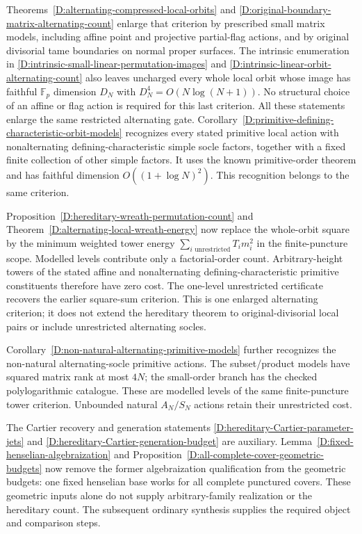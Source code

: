 Theorems~\ref{D:alternating-compressed-local-orbits} and
\ref{D:original-boundary-matrix-alternating-count} enlarge that
criterion by prescribed small matrix models, including affine point
and projective partial-flag actions, and by original divisorial tame
boundaries on normal proper surfaces. The intrinsic enumeration in
\ref{D:intrinsic-small-linear-permutation-images} and
\ref{D:intrinsic-linear-orbit-alternating-count} also leaves uncharged
every whole local orbit whose image has faithful $\mathbb F_p$
dimension $D_N$ with $D_N^4=O(N\log(N+1))$. No structural choice
of an affine or flag action is required for this last criterion.
All these statements enlarge the same restricted alternating gate.
Corollary~\ref{D:primitive-defining-characteristic-orbit-models}
recognizes every stated primitive local action with nonalternating
defining-characteristic simple socle factors, together with a fixed
finite collection of other simple factors. It uses the known
primitive-order theorem and has faithful dimension
$O((1+\log N)^2)$. This recognition belongs to the same criterion.

Proposition~\ref{D:hereditary-wreath-permutation-count} and
Theorem~\ref{D:alternating-local-wreath-energy} now replace the
whole-orbit square by the minimum weighted tower energy
$\sum_{i\text{ unrestricted}}T_i m_i^2$ in the finite-puncture
scope. Modelled levels contribute only a factorial-order count.
Arbitrary-height towers of the stated affine and nonalternating
defining-characteristic primitive constituents therefore have zero
cost. The one-level unrestricted certificate recovers the earlier
square-sum criterion. This is one enlarged alternating criterion;
it does not extend the hereditary theorem to original-divisorial
local pairs or include unrestricted alternating socles.

Corollary~\ref{D:non-natural-alternating-primitive-models} further
recognizes the non-natural alternating-socle primitive actions.
The subset/product models have squared matrix rank at most $4N$;
the small-order branch has the checked polylogarithmic catalogue.
These are modelled levels of the same finite-puncture tower criterion.
Unbounded natural $A_N/S_N$ actions retain their unrestricted cost.

The Cartier recovery and generation statements
\ref{D:hereditary-Cartier-parameter-jets} and
\ref{D:hereditary-Cartier-generation-budget} are auxiliary.
Lemma~\ref{D:fixed-henselian-algebraization} and
Proposition~\ref{D:all-complete-cover-geometric-budgets} now remove
the former algebraization qualification from the geometric budgets:
one fixed henselian base works for all complete punctured covers.
These geometric inputs alone do not supply arbitrary-family
realization or the hereditary count. The subsequent ordinary
synthesis supplies the required object and comparison steps.

